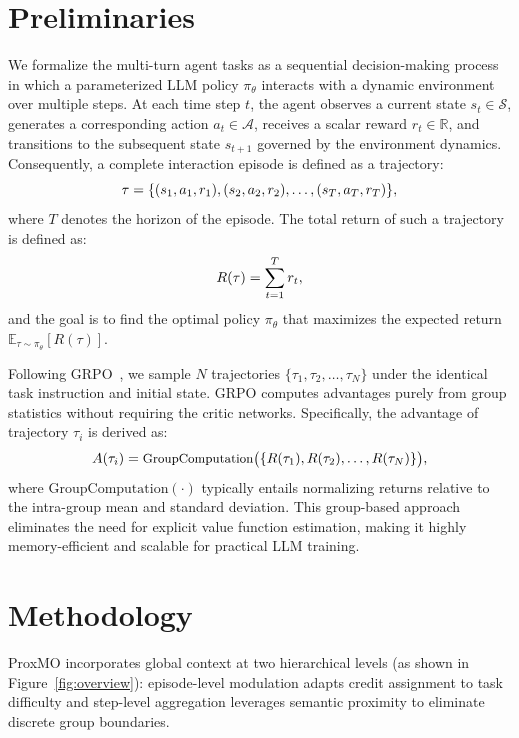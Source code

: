 \documentclass[11pt]{article}
\begin{document}
\section{Preliminaries}
\label{sec:preliminaries}
We formalize the multi-turn agent tasks as a sequential decision-making process in which a parameterized LLM policy $\pi_\theta$ interacts with a dynamic environment over multiple steps. At each time step $t$, the agent observes a current state $s_t \in \mathcal{S}$, generates a corresponding action $a_t \in \mathcal{A}$, receives a scalar reward $r_t \in \mathbb{R}$, and transitions to the subsequent state $s_{t+1}$ governed by the environment dynamics. Consequently, a complete interaction episode is defined as a trajectory:
\begin{equation}
\small
\label{eq:trajectory}
\tau = \{(s_1, a_1, r_1), (s_2, a_2, r_2), \ldots, (s_T, a_T, r_T)\},
\end{equation}
where $T$ denotes the horizon of the episode. The total return of such a trajectory is defined as:
\begin{equation}
\small
\label{eq:total_return}
R(\tau) = \sum_{t=1}^T r_t,
\end{equation}
and the goal is to find the optimal policy $\pi_\theta$ that maximizes the expected return $\mathbb{E}_{\tau \sim \pi_\theta}[R(\tau)]$.

Following GRPO~\cite{shao2024deepseekmath}, we sample $N$ trajectories $\{\tau_1, \tau_2, \ldots, \tau_N\}$ under the identical task instruction and initial state. GRPO computes advantages purely from group statistics without requiring the critic networks. Specifically, the advantage of trajectory $\tau_i$ is derived as:
\begin{equation}
\small
\label{eq:group_advantage}
A(\tau_i) = \text{GroupComputation}\bigl(\{R(\tau_1), R(\tau_2), \ldots, R(\tau_N)\}\bigr),
\end{equation}
where $\text{GroupComputation}(\cdot)$ typically entails normalizing returns relative to the intra-group mean and standard deviation. This group-based approach eliminates the need for explicit value function estimation, making it highly memory-efficient and scalable for practical LLM training.

\section{Methodology}

ProxMO incorporates global context at two hierarchical levels (as shown in Figure~\ref{fig:overview}): episode-level modulation adapts credit assignment to task difficulty and step-level aggregation leverages semantic proximity to eliminate discrete group boundaries.
\end{document}
